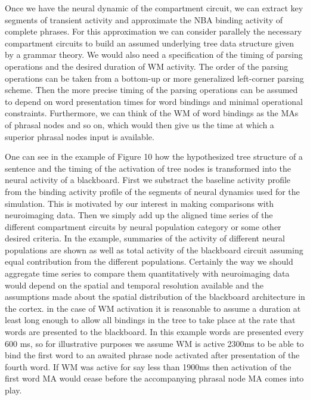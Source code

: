 \documentclass[10pt]{article}
\begin{document}
Once we have the neural dynamic of the compartment circuit, we can extract key segments of transient activity and approximate the NBA binding activity of complete phrases.
For this approximation we can consider parallely the necessary compartment circuits to build an assumed underlying tree data structure given by a grammar theory.
We would also need a specification of the timing of parsing operations and the desired duration of WM activity.
The order of the parsing operations can be taken from a bottom-up or more generalized left-corner parsing scheme.
Then the more precise timing of the parsing operations can be assumed to depend on word presentation times for word bindings and minimal operational constraints.
Furthermore, we can think of the WM of word bindings as the MAs of phrasal nodes and so on, which would then give us the time at which a superior phrasal nodes input is available.

One can see in the example of Figure 10 how the hypothesized tree structure of a sentence and the timing of the activation of tree nodes is transformed into the neural activity of a blackboard.
First we substract the baseline activity profile from the binding activity profile of the segments of neural dynamics used for the simulation.
This is motivated by our interest in making comparisons with neuroimaging data.
Then we simply add up the aligned time series of the different compartment circuits by neural population category or some other desired criteria.
In the example, summaries of the activity of different neural populations are shown as well as total activity of the blackboard circuit assuming equal contribution from the different populations.
Certainly the way we should aggregate time series to compare them quantitatively with neuroimaging data would depend on the spatial and temporal resolution available and the assumptions made about the spatial distribution of the blackboard architecture in the cortex.
in the case of WM activation it is reasonable to assume a duration at least long enough to allow all bindings in the tree to take place at the rate that words are presented to the blackboard.
In this example words are presented every 600 ms, so for illustrative purposes we assume WM is active 2300ms to be able to bind the first word to an awaited phrase node activated after presentation of the fourth word.
If WM was active for say less than 1900ms then activation of the first word MA would cease before the accompanying phrasal node MA comes into play.
\end{document}
